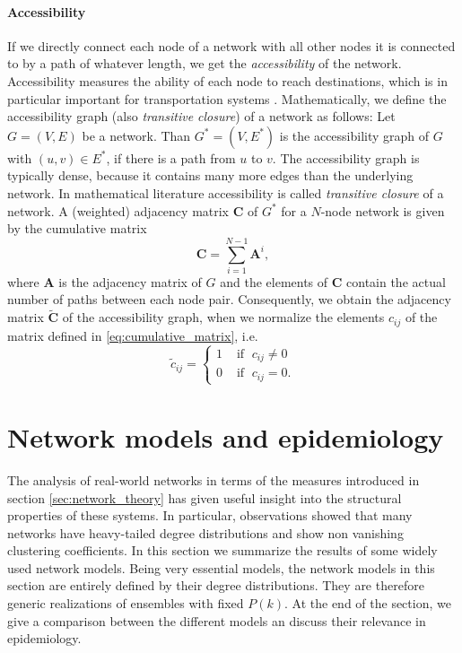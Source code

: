 \paragraph{Accessibility\color{Cayenne}{.}}
If we directly connect each node of a network with all other nodes it is connected to by a path of whatever length, we get the \emph{accessibility} of the network.
Accessibility measures the ability of each node to reach destinations, which is in particular important for transportation systems \citep{Garrison:1960up}.
Mathematically, we define the accessibility graph (also \emph{transitive closure}) of a network as follows:
Let $G=(V,E)$ be a network.
Than $G^*=(V,E^*)$ is the accessibility graph of $G$ with $(u,v) \in E^*$, if there is a path from $u$ to $v$.
The accessibility graph is typically dense, because it contains many more edges than the underlying network.
In mathematical literature accessibility is called \emph{transitive closure} of a network.
A (weighted) adjacency matrix $\mathbf{C}$ of $G^*$ for a $N$-node network is given by the cumulative matrix
\begin{equation}\label{eq:cumulative_matrix}
\mathbf{C}= \sum _{i=1} ^{N-1} \mathbf{A}^i,
\end{equation}
where $\mathbf{A}$ is the adjacency matrix of $G$ and the elements of $\mathbf{C}$ contain the actual number of paths between each node pair.
Consequently, we obtain the adjacency matrix $\tilde{\mathbf{C}}$ of the accessibility graph, when we normalize the elements $c_{ij}$ of the matrix defined in \eqref{eq:cumulative_matrix}, i.e.
\begin{equation}\label{eq:normalize_cumu_matrix}
\tilde{c}_{ij}=%
\begin{cases} 
1 & \text{ if }\; c_{ij}\neq 0 \\
0 &  \text{ if } \; c_{ij}=0 .
\end{cases}
\end{equation}



\section{Network models and epidemiology}\label{sec:network_models}
The analysis of real-world networks in terms of the measures introduced in section \ref{sec:network_theory} has given useful insight into the structural properties of these systems.
In particular, observations showed that many networks have heavy-tailed degree distributions and show non vanishing clustering coefficients.
In this section we summarize the results of some widely used network models.
Being very essential models, the network models in this section are entirely defined by their degree distributions.
They are therefore generic realizations of ensembles with fixed $P(k)$.
At the end of the section, we give a comparison between the different models an discuss their relevance in epidemiology.

